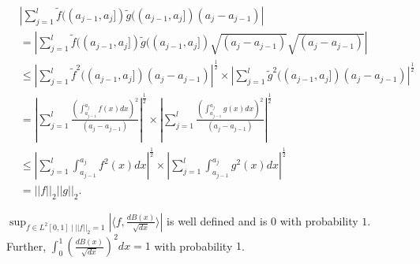 \documentclass[10pt,a4paper]{amsart}
\let\tilde\widetilde
\begin{document}
    \begin{equation}\label{eq:bound}
        \begin{split}
         &\left| \sum_{j=1}^{l} \tilde{f}((a_{j-1},a_{j}]) \tilde{g}((a_{j-1},a_{j}]) (a_{j}-a_{j-1})\right|\\
         &= \left| \sum_{j=1}^{l} \tilde{f}((a_{j-1},a_{j}]) \tilde{g}((a_{j-1},a_{j}]) \sqrt{(a_{j}-a_{j-1})} \sqrt{(a_{j}-a_{j-1})}\right|\\
         & \le \left| \sum_{j=1}^{l} \tilde{f}^2((a_{j-1},a_{j}])(a_{j}-a_{j-1}) \right|^{\frac{1}{2}}\times \left| \sum_{j=1}^{l} \tilde{g}^2((a_{j-1},a_{j}])(a_{j}-a_{j-1}) \right|^{\frac{1}{2}} \\
         &= \left| \sum_{j=1}^{l} \frac{\left(\int_{a_{j-1}}^{a_{j}} f(x) dx\right)^2}{(a_{j}-a_{j-1})}\right|^{\frac{1}{2}} \times \left| \sum_{j=1}^{l} \frac{\left(\int_{a_{j-1}}^{a_{j}} g(x) dx\right)^2}{(a_{j}-a_{j-1})}\right|^{\frac{1}{2}}\\
         &\le \left| \sum_{j=1}^{l} \int_{a_{j-1}}^{a_{j}} f^{2}(x)dx \right|^{\frac{1}{2}} \times \left| \sum_{j=1}^{l} \int_{a_{j-1}}^{a_{j}} g^{2}(x)dx \right|^{\frac{1}{2}}\\
         & = ||f||_{2}||g||_{2}.
        \end{split}
    \end{equation}

\begin{lemma}
 $\sup_{f \in L^{2}[0,1] ~|~ ||f||_{2}=1}\left|\langle f, \frac{dB(x)}{\sqrt{dx}} \rangle\right|$ is well defined and is $0$ with probability $1$. Further, $\int_{0}^{1} \left( \frac{dB(x)}{\sqrt{dx}} \right)^{2} dx=1$ with probability $1$.
\end{lemma}
\end{document}
